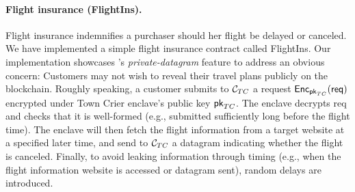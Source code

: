 \paragraph{Flight insurance ({\sf FlightIns}).}
Flight insurance indemnifies a purchaser should her flight be delayed or canceled.
We have implemented a simple flight insurance contract called {\sf FlightIns}.
Our implementation showcases \tc's {\it private-datagram} feature to address an obvious concern:
Customers may not wish to reveal their travel plans publicly on the blockchain. 
Roughly speaking, 
a customer submits to ${\cal C}_{TC}$ a 
request ${\sf Enc}_{{\sf pk}_{TC}}({\sf req})$ 
encrypted under Town Crier enclave's public 
key ${\sf pk}_{TC}$. The enclave decrypts
{\sf req} and checks that it is well-formed (e.g., submitted
sufficiently long before the flight time).
The enclave will then fetch the flight information from a target website
at a specified later time, and send to ${\cal C}_{TC}$ a datagram indicating
whether the flight is canceled. 
Finally, to avoid leaking information through timing (e.g.,
when the flight 
information website is accessed or datagram sent), random delays are introduced.


